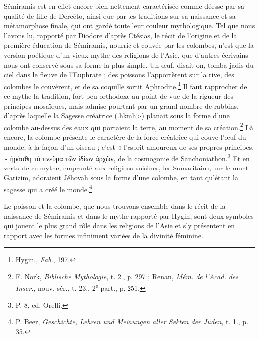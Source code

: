 \documentclass[a4paper, 11pt, oneside]{article}
\begin{document}
Sémiramis est en effet encore bien nettement caractérisée comme déesse par sa qualité de fille de Dercéto, ainsi que par les traditions sur sa naissance et sa métamorphose finale, qui ont gardé toute leur couleur mythologique. Tel que nous l'avons lu, rapporté par Diodore d'après Ctésias, le récit de l'origine et de la première éducation de Sémiramis, nourrie et couvée par les colombes, n'est que la version poétique d'un vieux mythe des religions de l'Asie, que d'autres écrivains nous ont conservé sous sa forme la plus simple. Un œuf, disait-on, tomba jadis du ciel dans le fleuve de l'Euphrate ; des poissons l'apportèrent sur la rive, des colombes le couvèrent, et de sa coquille sortit Aphrodite.\footnote{Hygin., \emph{Fab.}, 197.} Il faut rapprocher de ce mythe la tradition, fort peu orthodoxe au point de vue de la rigueur des principes mosaïques, mais admise pourtant par un grand nombre de rabbins, d'après laquelle la Sagesse créatrice (\<.hkmh>) planait sous la forme d'une colombe au-dessus des eaux qui portaient la terre, au moment de sa création.\footnote{F. Nork, \emph{Biblische Mythologie}, t. 2., p. 297 ; Renan, \emph{Mém. de l'Acad. des Inscr.}, nouv. sér., t. 23., 2\textsuperscript{e} part., p. 251.} Là encore, la colombe présente le caractère de la force créatrice qui couve l'œuf du monde, à la façon d'un oiseau ; c'est « l'esprit amoureux de ses propres principes, » ἡρἁσθη τὸ πνεῦμα τῶν ἰδίων ἀρχῶν, de la cosmogonie de Sanchoniathon.\footnote{P. 8, ed. Orelli.} Et en vertu de ce mythe, emprunté aux religions voisines, les Samaritains, sur le mont Garizim, adoraient Jéhovah sous la forme d'une colombe, en tant qu'étant la sagesse qui a créé le monde.\footnote{P. Beer, \emph{Geschichte, Lehren und Meinungen aller Sekten der Juden}, t. 1., p. 35.}

Le poisson et la colombe, que nous trouvons ensemble dans le récit de la naissance de Sémiramis et dans le mythe rapporté par Hygin, sont deux symboles qui jouent le plus grand rôle dans les religions de l'Asie et s'y présentent en rapport avec les formes infiniment variées de la divinité féminine.
\end{document}
